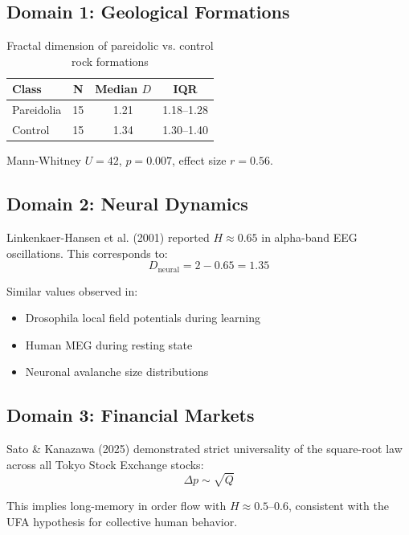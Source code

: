 \documentclass[11pt,a4paper]{article}
\begin{document}
\subsection{Domain 1: Geological Formations}

\begin{table}[H]
\centering
\caption{Fractal dimension of pareidolic vs. control rock formations}
\begin{tabular}{lccc}
\toprule
\textbf{Class} & \textbf{N} & \textbf{Median $D$} & \textbf{IQR} \\
\midrule
Pareidolia & 15 & 1.21 & 1.18--1.28 \\
Control & 15 & 1.34 & 1.30--1.40 \\
\bottomrule
\end{tabular}
\end{table}

Mann-Whitney $U = 42$, $p = 0.007$, effect size $r = 0.56$.

\subsection{Domain 2: Neural Dynamics}

Linkenkaer-Hansen et al. (2001) reported $H \approx 0.65$ in alpha-band EEG oscillations. This corresponds to:
\begin{equation}
D_{\text{neural}} = 2 - 0.65 = 1.35
\end{equation}

Similar values observed in:
\begin{itemize}
    \item Drosophila local field potentials during learning
    \item Human MEG during resting state
    \item Neuronal avalanche size distributions
\end{itemize}

\subsection{Domain 3: Financial Markets}

Sato \& Kanazawa (2025) demonstrated strict universality of the square-root law across all Tokyo Stock Exchange stocks:
\begin{equation}
\Delta p \sim \sqrt{Q}
\end{equation}

This implies long-memory in order flow with $H \approx 0.5$--$0.6$, consistent with the UFA hypothesis for collective human behavior.
\end{document}
